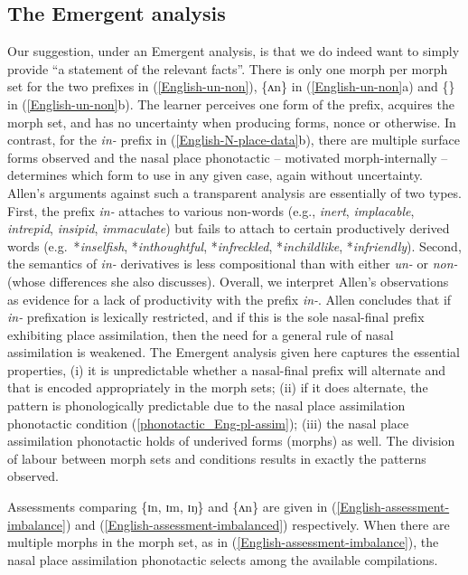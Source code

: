 \subsection{The Emergent analysis}
Our suggestion, under an Emergent analysis, is  that we do indeed want to simply provide ``a statement of the relevant facts''. There is only one morph per morph set for the two prefixes in (\ref{English-un-non}),  \{ʌn\} in (\ref{English-un-non}a) and \{\} in (\ref{English-un-non}b). The learner perceives one form of the prefix,  acquires the morph set, and has no uncertainty when producing forms, nonce or otherwise. In contrast, for the \textit{in-} prefix in (\ref{English-N-place-data}b), there are multiple surface forms observed and the nasal place phonotactic -- motivated morph-internally -- determines which form to use in any given case, again without uncertainty. Allen's arguments against such a transparent analysis are essentially of two types. First, the prefix \textit{in-} attaches to various non-words (e.g., {\it inert}, {\it implacable}, {\it intrepid}, {\it insipid}, {\it immaculate}) but fails to attach to certain productively derived words (e.g.\ *{\it inselfish}, *{\it inthoughtful}, *{\it infreckled}, *{\it inchildlike}, *{\it infriendly}). Second, the semantics of \textit{in-} derivatives is less compositional than with either \textit{un-} or \textit{non-} (whose differences she also discusses). Overall, we interpret Allen's observations as evidence for a lack of productivity with the prefix {\it in-}. Allen concludes that if {\it in-} prefixation is lexically restricted, and if this is the sole nasal-final prefix exhibiting place assimilation, then the need for a general rule of nasal assimilation is weakened. The Emergent analysis  given here captures the essential properties, (i)  it is unpredictable whether a nasal-final prefix will alternate and that is encoded appropriately in the morph sets; (ii) if it does alternate, the pattern is phonologically predictable due to the nasal place assimilation phonotactic condition (\ref{phonotactic_Eng-pl-assim}); (iii) the nasal place assimilation phonotactic holds of underived forms (morphs) as well. The division of labour between morph sets and conditions results in exactly the patterns observed.\largerpage[2]


Assessments comparing \{ɪn, ɪm, ɪŋ\} and \{ʌn\} are given in (\ref{English-assessment-imbalance}) and (\ref{English-assessment-imbalanced}) respectively. When there are multiple morphs in the morph set, as in (\ref{English-assessment-imbalance}), the nasal place assimilation phonotactic selects among the available compilations.

